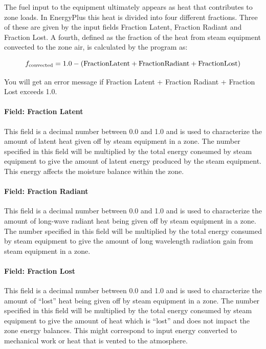The fuel input to the equipment ultimately appears as heat that contributes to zone loads. In EnergyPlus this heat is divided into four different fractions. Three of these are given by the input fields Fraction Latent, Fraction Radiant and Fraction Lost. A fourth, defined as the fraction of the heat from steam equipment convected to the zone air, is calculated by the program as:

\begin{equation}
  f_{\rm{convected}} = 1.0 - (\rm{Fraction Latent} + \rm{Fraction Radiant} + \rm{Fraction Lost})
\end{equation}

You will get an error message if Fraction Latent + Fraction Radiant + Fraction Lost exceeds 1.0.

\paragraph{Field: Fraction Latent}\label{field-fraction-latent-3}

This field is a decimal number between 0.0 and 1.0 and is used to characterize the amount of latent heat given off by steam equipment in a zone. The number specified in this field will be multiplied by the total energy consumed by steam equipment to give the amount of latent energy produced by the steam equipment. This energy affects the moisture balance within the zone.

\paragraph{Field: Fraction Radiant}\label{field-fraction-radiant-5}

This field is a decimal number between 0.0 and 1.0 and is used to characterize the amount of long-wave radiant heat being given off by steam equipment in a zone. The number specified in this field will be multiplied by the total energy consumed by steam equipment to give the amount of long wavelength radiation gain from steam equipment in a zone.

\paragraph{Field: Fraction Lost}\label{field-fraction-lost-3}

This field is a decimal number between 0.0 and 1.0 and is used to characterize the amount of ``lost'' heat being given off by steam equipment in a zone. The number specified in this field will be multiplied by the total energy consumed by steam equipment to give the amount of heat which is ``lost'' and does not impact the zone energy balances. This might correspond to input energy converted to mechanical work or heat that is vented to the atmosphere.

